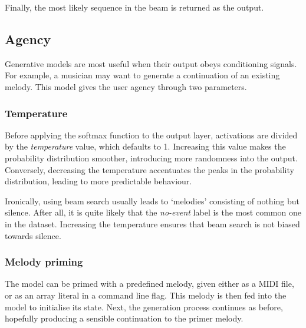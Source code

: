 \documentclass[../../report.tex]{subfiles}
\begin{document}
Finally, the most likely sequence in the beam is returned as the output.

\subsection{Agency}

Generative models are most useful when their output obeys conditioning signals.
For example, a musician may want to generate a continuation of an existing
melody. This model gives the user agency through two parameters.

\subsubsection{Temperature}
Before applying the softmax function to the output layer, activations are
divided by the \emph{temperature} value, which defaults to 1. Increasing this
value makes the probability distribution smoother, introducing more randomness
into the output. Conversely, decreasing the temperature accentuates the peaks in
the probability distribution, leading to more predictable behaviour.

Ironically, using beam search usually leads to `melodies' consisting of nothing
but silence. After all, it is quite likely that the \emph{no-event} label is the
most common one in the dataset. Increasing the temperature ensures that beam
search is not biased towards silence.

\subsubsection{Melody priming}
The model can be primed with a predefined melody, given either as a MIDI file,
or as an array literal in a command line flag. This melody is then fed into the
model to initialise its state. Next, the generation process continues as before,
hopefully producing a sensible continuation to the primer melody.
\end{document}
